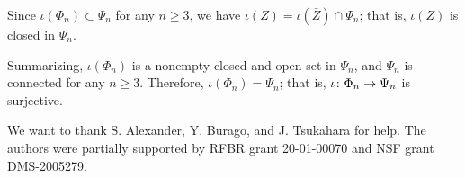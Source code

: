 \documentclass[oneside,a4paper]{article}
\begin{document}
Since $\iota(\Phi_n)\subset \Psi_n$ for any $n\ge 3$, we have  $\iota (Z)=\iota(\bar Z)\cap \Psi_n$;
that is, $\iota (Z)$ is closed in $\Psi_n$. 

\medskip

Summarizing, $\iota(\Phi_n)$ is a nonempty closed and open set in $\Psi_n$, and $\Psi_n$ is connected for any $n\ge 3$.
Therefore, $\iota(\Phi_n)=\Psi_n$; that is, $\iota\:\Phi_n\z\to\Psi_n$ is surjective.
\qeds

 We want to thank S. Alexander, Y. Burago, and J. Tsukahara for help. 
The authors were partially supported by RFBR grant 20-01-00070 and NSF grant DMS-2005279.

\sloppy
\printbibliography[heading=bibintoc]
\fussy
\end{document}
